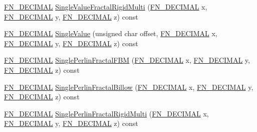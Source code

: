 \begin{DoxyCompactItemize}
\item 
\mbox{\hyperlink{_fast_noise_8h_a75a9ef6d2541c4921815b885bfd449c3}{F\+N\+\_\+\+D\+E\+C\+I\+M\+AL}} \mbox{\hyperlink{class_fast_noise_a252117bcf7130247e06fa0bd1695c41e}{Single\+Value\+Fractal\+Rigid\+Multi}} (\mbox{\hyperlink{_fast_noise_8h_a75a9ef6d2541c4921815b885bfd449c3}{F\+N\+\_\+\+D\+E\+C\+I\+M\+AL}} x, \mbox{\hyperlink{_fast_noise_8h_a75a9ef6d2541c4921815b885bfd449c3}{F\+N\+\_\+\+D\+E\+C\+I\+M\+AL}} y, \mbox{\hyperlink{_fast_noise_8h_a75a9ef6d2541c4921815b885bfd449c3}{F\+N\+\_\+\+D\+E\+C\+I\+M\+AL}} z) const
\item 
\mbox{\hyperlink{_fast_noise_8h_a75a9ef6d2541c4921815b885bfd449c3}{F\+N\+\_\+\+D\+E\+C\+I\+M\+AL}} \mbox{\hyperlink{class_fast_noise_a982fae6250ecadc33331384167fcbc2d}{Single\+Value}} (unsigned char offset, \mbox{\hyperlink{_fast_noise_8h_a75a9ef6d2541c4921815b885bfd449c3}{F\+N\+\_\+\+D\+E\+C\+I\+M\+AL}} x, \mbox{\hyperlink{_fast_noise_8h_a75a9ef6d2541c4921815b885bfd449c3}{F\+N\+\_\+\+D\+E\+C\+I\+M\+AL}} y, \mbox{\hyperlink{_fast_noise_8h_a75a9ef6d2541c4921815b885bfd449c3}{F\+N\+\_\+\+D\+E\+C\+I\+M\+AL}} z) const
\item 
\mbox{\hyperlink{_fast_noise_8h_a75a9ef6d2541c4921815b885bfd449c3}{F\+N\+\_\+\+D\+E\+C\+I\+M\+AL}} \mbox{\hyperlink{class_fast_noise_ab2189c13cfabb4e900c6e63d74962ce2}{Single\+Perlin\+Fractal\+F\+BM}} (\mbox{\hyperlink{_fast_noise_8h_a75a9ef6d2541c4921815b885bfd449c3}{F\+N\+\_\+\+D\+E\+C\+I\+M\+AL}} x, \mbox{\hyperlink{_fast_noise_8h_a75a9ef6d2541c4921815b885bfd449c3}{F\+N\+\_\+\+D\+E\+C\+I\+M\+AL}} y, \mbox{\hyperlink{_fast_noise_8h_a75a9ef6d2541c4921815b885bfd449c3}{F\+N\+\_\+\+D\+E\+C\+I\+M\+AL}} z) const
\item 
\mbox{\hyperlink{_fast_noise_8h_a75a9ef6d2541c4921815b885bfd449c3}{F\+N\+\_\+\+D\+E\+C\+I\+M\+AL}} \mbox{\hyperlink{class_fast_noise_a4e99adf451ddbd11a425a0909b2ae7e1}{Single\+Perlin\+Fractal\+Billow}} (\mbox{\hyperlink{_fast_noise_8h_a75a9ef6d2541c4921815b885bfd449c3}{F\+N\+\_\+\+D\+E\+C\+I\+M\+AL}} x, \mbox{\hyperlink{_fast_noise_8h_a75a9ef6d2541c4921815b885bfd449c3}{F\+N\+\_\+\+D\+E\+C\+I\+M\+AL}} y, \mbox{\hyperlink{_fast_noise_8h_a75a9ef6d2541c4921815b885bfd449c3}{F\+N\+\_\+\+D\+E\+C\+I\+M\+AL}} z) const
\item 
\mbox{\hyperlink{_fast_noise_8h_a75a9ef6d2541c4921815b885bfd449c3}{F\+N\+\_\+\+D\+E\+C\+I\+M\+AL}} \mbox{\hyperlink{class_fast_noise_ad5d0bbafb8bc1e07c3d771455736600d}{Single\+Perlin\+Fractal\+Rigid\+Multi}} (\mbox{\hyperlink{_fast_noise_8h_a75a9ef6d2541c4921815b885bfd449c3}{F\+N\+\_\+\+D\+E\+C\+I\+M\+AL}} x, \mbox{\hyperlink{_fast_noise_8h_a75a9ef6d2541c4921815b885bfd449c3}{F\+N\+\_\+\+D\+E\+C\+I\+M\+AL}} y, \mbox{\hyperlink{_fast_noise_8h_a75a9ef6d2541c4921815b885bfd449c3}{F\+N\+\_\+\+D\+E\+C\+I\+M\+AL}} z) const

\end{DoxyCompactItemize}

